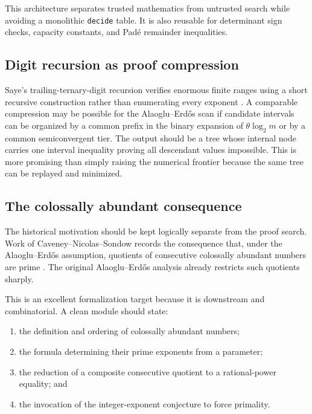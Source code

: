 \documentclass[10pt,letterpaper]{article}
\begin{document}
This architecture separates trusted mathematics from untrusted search while avoiding a
monolithic \texttt{decide} table.  It is also reusable for determinant sign checks, capacity
constants, and Pad\'e remainder inequalities.

\subsection{Digit recursion as proof compression}

Saye's trailing-ternary-digit recursion verifies enormous finite ranges using a short
recursive construction rather than enumerating every exponent \cite{Saye2022}.  A comparable
compression may be possible for the Alaoglu--Erd\H{o}s scan if candidate intervals can be
organized by a common prefix in the binary expansion of \(\theta\log_2m\) or by a common
semiconvergent tier.  The output should be a tree whose internal node carries one interval
inequality proving all descendant values impossible.  This is more promising than simply
raising the numerical frontier because the same tree can be replayed and minimized.

\subsection{The colossally abundant consequence}

The historical motivation should be kept logically separate from the proof search.  Work of
Caveney--Nicolas--Sondow records the consequence that, under the Alaoglu--Erd\H{o}s
assumption, quotients of consecutive colossally abundant numbers are prime
\cite{CaveneyNicolasSondow}.  The original Alaoglu--Erd\H{o}s analysis already restricts such
quotients sharply.

This is an excellent formalization target because it is downstream and combinatorial.  A
clean module should state:

\begin{enumerate}
\item the definition and ordering of colossally abundant numbers;
\item the formula determining their prime exponents from a parameter;
\item the reduction of a composite consecutive quotient to a rational-power equality; and
\item the invocation of the integer-exponent conjecture to force primality.
\end{enumerate}
\end{document}
